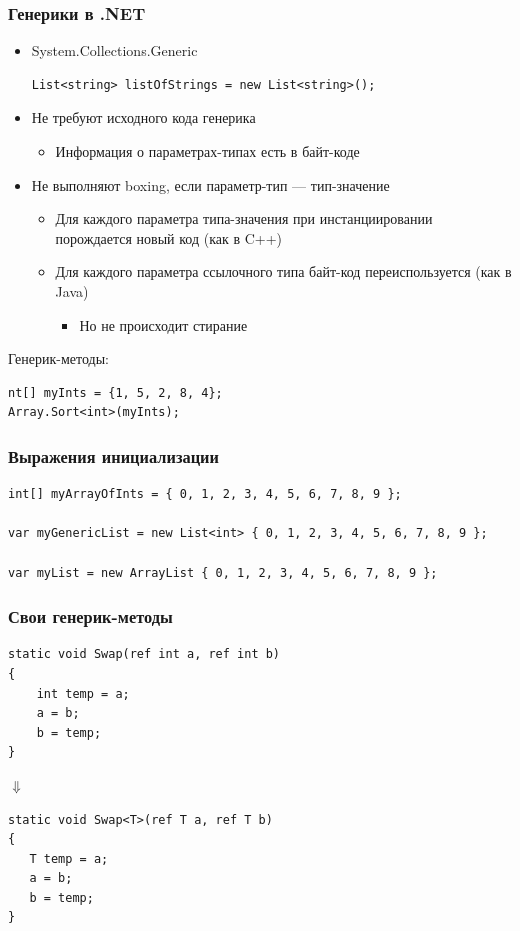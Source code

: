 \documentclass[xetex,mathserif,serif]{beamer}
\begin{document}
	\begin{frame}[fragile]
		\frametitle{Генерики в .NET}
		\begin{itemize}
			\item System.Collections.Generic
			\begin{verbatim}
List<string> listOfStrings = new List<string>();
			\end{verbatim}
			\item Не требуют исходного кода генерика
			\begin{itemize}
				\item Информация о параметрах-типах есть в байт-коде
			\end{itemize}
			\item Не выполняют boxing, если параметр-тип --- тип-значение
			\begin{itemize}
				\item Для каждого параметра типа-значения при инстанциировании порождается новый код (как в C++)
				\item Для каждого параметра ссылочного типа байт-код переиспользуется (как в Java)
				\begin{itemize}
					\item Но не происходит стирание
				\end{itemize}
			\end{itemize}
		\end{itemize}

		Генерик-методы:
		\begin{verbatim}
nt[] myInts = {1, 5, 2, 8, 4};
Array.Sort<int>(myInts);
		\end{verbatim}
	\end{frame}

	\begin{frame}[fragile]
		\frametitle{Выражения инициализации}
		\begin{verbatim}
int[] myArrayOfInts = { 0, 1, 2, 3, 4, 5, 6, 7, 8, 9 };

var myGenericList = new List<int> { 0, 1, 2, 3, 4, 5, 6, 7, 8, 9 };

var myList = new ArrayList { 0, 1, 2, 3, 4, 5, 6, 7, 8, 9 };
		\end{verbatim}
	\end{frame}

	\begin{frame}[fragile]
		\frametitle{Свои генерик-методы}
		\begin{verbatim}
static void Swap(ref int a, ref int b)
{
    int temp = a;
    a = b;
    b = temp;
}
		\end{verbatim}
		\hspace{2cm} $\Downarrow$
		\begin{verbatim}
static void Swap<T>(ref T a, ref T b)
{
   T temp = a;
   a = b;
   b = temp;
}
		\end{verbatim}
	\end{frame}
\end{document}
